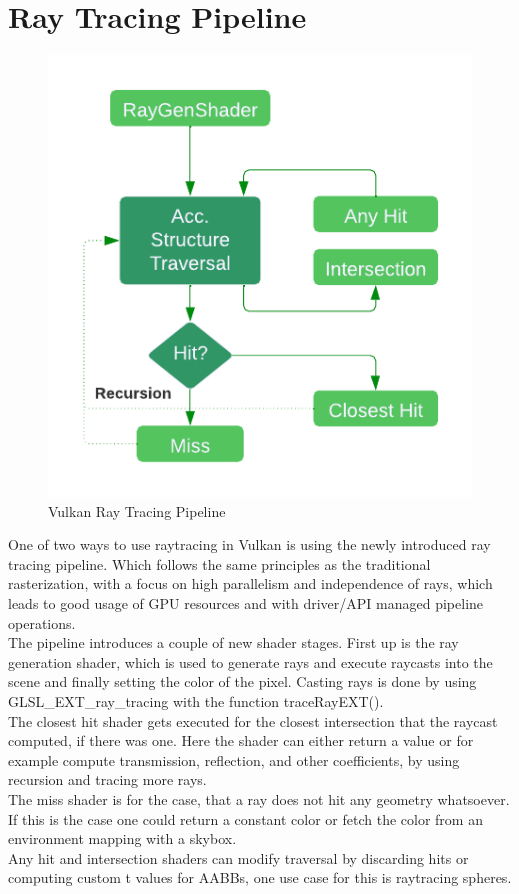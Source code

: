 \section{Ray Tracing Pipeline}
\label{sec:VkRayPipe}
\begin{figure}
    \centering
    \includegraphics[width=.6\textwidth]{images/showcase/RayPipeline.pdf}
    \caption{Vulkan Ray Tracing Pipeline \cite{vulkanRayTracing}}
    \label{fig:VkRayPipeline}
\end{figure}
One of two ways to use raytracing in Vulkan is using the newly introduced ray tracing pipeline. Which follows the same principles as the traditional rasterization, with a focus on high parallelism and independence of rays, which leads to good usage of GPU resources and with driver/API managed pipeline operations. \\
The pipeline introduces a couple of new shader stages. First up is the ray generation shader, which is used to generate rays and execute raycasts into the scene and finally setting the color of the pixel. Casting rays is done by using GLSL\_EXT\_ray\_tracing with the function traceRayEXT().\\
The closest hit shader gets executed for the closest intersection that the raycast computed, if there was one. Here the shader can either return a value or for example compute transmission, reflection, and other coefficients, by using recursion and tracing more rays.\\
The miss shader is for the case, that a ray does not hit any geometry whatsoever. If this is the case one could return a constant color or fetch the color from an environment mapping with a skybox.\\
Any hit and intersection shaders can modify traversal by discarding hits or computing custom t values for AABBs, one use case for this is raytracing spheres.\\ \cite{vulkanRayTracing}
\newpage
